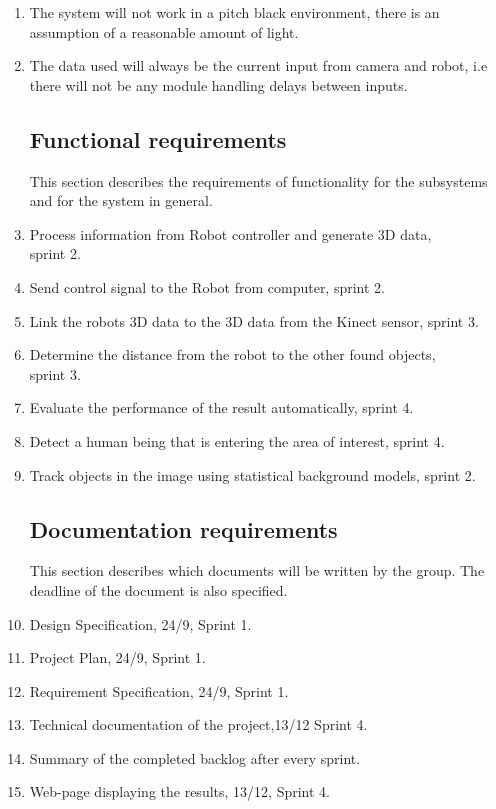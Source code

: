 \documentclass[10pt,a4paper]{article}
\begin{document}
\begin{enumerate}
\item The system will not work in a pitch black environment, there is an assumption of a reasonable amount of light.

\item The data used will always be the current input from camera and robot, i.e there will not be any module handling delays between inputs.

\subsection{Functional requirements}
This section describes the requirements of functionality for the subsystems and for the system in general.
\item Process information from Robot controller and generate 3D data, \\sprint 2.
\item Send control signal to the Robot from computer, sprint 2.
\item Link the robots 3D data to the 3D data from the Kinect sensor, sprint 3.

\item Determine the distance from the robot to the other found objects, \\sprint 3.

\item Evaluate the performance of the result automatically, sprint 4.

\item Detect a human being that is entering the area of interest, sprint 4.

\item Track objects in the image using statistical background models, sprint 2.

\subsection{Documentation requirements}
This section describes which documents will be written by the group. The deadline of the document is also specified.
\item Design Specification, 24/9, Sprint 1.
\item Project Plan, 24/9, Sprint 1.
\item Requirement Specification, 24/9, Sprint 1.
\item Technical documentation of the project,13/12  Sprint 4.
\item Summary of the completed backlog after every sprint.
\item Web-page displaying the results, 13/12, Sprint 4.




\end{enumerate}
\end{document}
